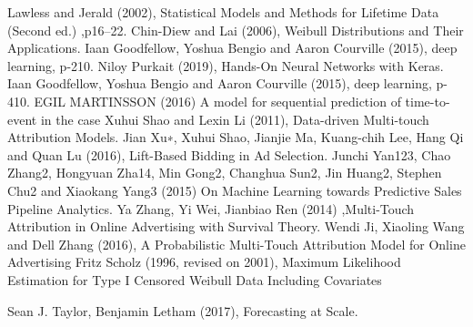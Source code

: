 
\begin{thebibliography}{8}

Lawless and Jerald (2002), Statistical Models and Methods for Lifetime Data (Second ed.) ,p16--22. 
Chin-Diew and Lai (2006), Weibull Distributions and Their Applications.
 Iaan Goodfellow, Yoshua Bengio and Aaron Courville (2015), deep learning, p-210. 
Niloy Purkait (2019), Hands-On Neural Networks with Keras.
 Iaan Goodfellow, Yoshua Bengio and Aaron Courville (2015), deep learning, p-410. 
EGIL MARTINSSON (2016) A model for sequential prediction of time-to-event in the case
Xuhui Shao and Lexin Li (2011), Data-driven Multi-touch Attribution Models. 
Jian Xu∗, Xuhui Shao, Jianjie Ma, Kuang-chih Lee, Hang Qi and Quan Lu (2016), Lift-Based Bidding in Ad Selection.
Junchi Yan123, Chao Zhang2, Hongyuan Zha14, Min Gong2, Changhua Sun2, Jin Huang2, Stephen Chu2 and Xiaokang Yang3 (2015) On Machine Learning towards Predictive Sales Pipeline Analytics. 
Ya Zhang, Yi Wei, Jianbiao Ren (2014) ,Multi-Touch Attribution in Online Advertising with Survival Theory.
Wendi Ji, Xiaoling Wang and Dell Zhang (2016), A Probabilistic Multi-Touch Attribution Model for Online Advertising
Fritz Scholz (1996, revised on 2001), Maximum Likelihood Estimation for Type I Censored Weibull Data Including Covariates


Sean J. Taylor, Benjamin Letham (2017),  Forecasting at Scale. 
\end{thebibliography}